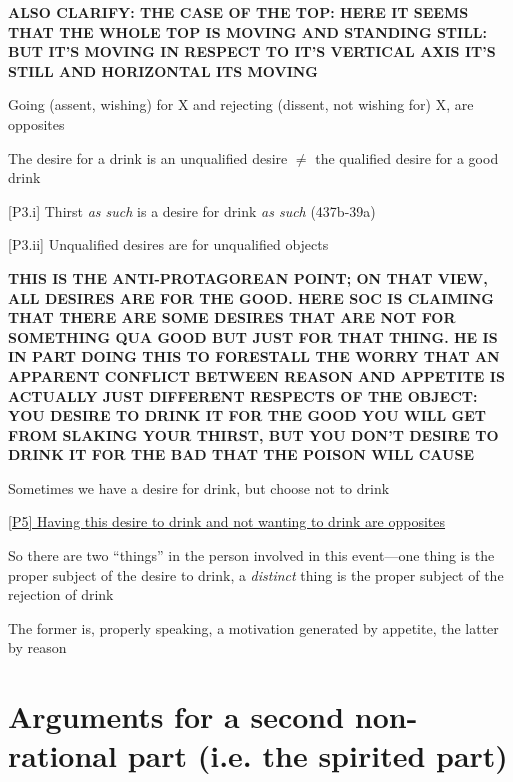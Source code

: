 \documentclass[11pt]{article}
\begin{document}
\noindent\textbf{ALSO CLARIFY: THE CASE OF THE TOP: HERE IT SEEMS THAT THE WHOLE TOP IS MOVING AND STANDING STILL: BUT IT'S MOVING IN RESPECT TO IT'S VERTICAL AXIS IT'S STILL AND HORIZONTAL ITS MOVING}
\vspace*{1mm}

\noindent [P2] Going (assent, wishing) for X and rejecting (dissent, not wishing for) X, are opposites
\vspace*{1mm}

\noindent [P3] The desire for a drink is an unqualified desire $\neq$ the qualified desire for a good drink
\vspace*{1mm}

[P3.i] Thirst \emph{as such} is a desire for drink \emph{as such} (437b-39a)
\vspace*{1mm}

[P3.ii] Unqualified desires are for unqualified objects
\vspace*{1mm}

\noindent\textbf{THIS IS THE ANTI-PROTAGOREAN POINT; ON THAT VIEW, ALL DESIRES ARE FOR THE GOOD. HERE SOC IS CLAIMING THAT THERE ARE SOME DESIRES THAT ARE NOT FOR SOMETHING QUA GOOD BUT JUST FOR THAT THING. HE IS IN PART DOING THIS TO FORESTALL THE WORRY THAT AN APPARENT CONFLICT BETWEEN REASON AND APPETITE IS ACTUALLY JUST DIFFERENT RESPECTS OF THE OBJECT: YOU DESIRE TO DRINK IT FOR THE GOOD YOU WILL GET FROM SLAKING YOUR THIRST, BUT YOU DON'T DESIRE TO DRINK IT FOR THE BAD THAT THE POISON WILL CAUSE}
\vspace*{1mm}

\noindent [P4] Sometimes we have a desire for drink, but choose not to drink
\vspace*{1mm}

\noindent\underline{[P5] Having this desire to drink and not wanting to drink are opposites}
\vspace*{1mm}

\noindent [C] So there are two ``things'' in the person involved in this event---one thing is the proper subject of the desire to drink, a \emph{distinct} thing is the proper subject of the rejection of drink
\vspace*{1mm}

\noindent The former is, properly speaking, a motivation generated by appetite, the latter by reason
\vspace*{-3mm}

\section*{Arguments for a second non-rational part (i.e. the spirited part)}
\end{document}
